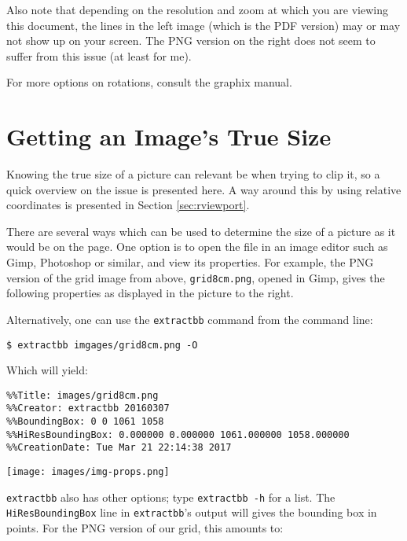 \documentclass[a4paper,11pt]{article}
\newcommand\code[1]{\texttt{#1}}
\begin{document}
Also note that depending  on the resolution and zoom at  which you are viewing
this document, the lines  in the left image (which is the  PDF version) may or
may not show up on your screen. The PNG  version on the right does not seem to
suffer from this issue (at least for me).

For more options on rotations, consult the graphix manual.


\section{Getting an Image's True Size}
\label{sec:true-size}

\begin{minipage}[t][][b]{0.65\textwidth}
    Knowing the true size of a picture can relevant be when trying to clip it,
    so a quick overview  on the issue is presented here. A  way around this by
    using relative coordinates is presented in Section \ref{sec:rviewport}.

    There  are several  ways which  can be  used to  determine the  size of  a
    picture as  it would be  on the  page. One option is  to open the  file in
    an  image  editor  such  as  Gimp, Photoshop  or  similar,  and  view  its
    properties. For example,  the PNG  version of the  grid image  from above,
    \code{grid8cm.png},  opened in  Gimp,  gives the  following properties  as
    displayed in the picture to the right.

    Alternatively, one can  use the \code{extractbb} command  from the command
    line:
    \begin{verbatim}
$ extractbb imgages/grid8cm.png -O
    \end{verbatim}

    Which will yield:
    \begin{verbatim}
%%Title: images/grid8cm.png
%%Creator: extractbb 20160307
%%BoundingBox: 0 0 1061 1058
%%HiResBoundingBox: 0.000000 0.000000 1061.000000 1058.000000
%%CreationDate: Tue Mar 21 22:14:38 2017
    \end{verbatim}
\end{minipage}
\hfill
\begin{minipage}[t][][b]{0.3\textwidth}
\texttt{[image: images/img-props.png]}
\end{minipage}

\code{extractbb} also has other options; type \code{extractbb -h} for a list.
The \code{HiResBoundingBox} line in \code{extractbb}'s output will gives the
bounding box in points\footnotemark. For the PNG version of our grid, this
amounts to:
\end{document}
